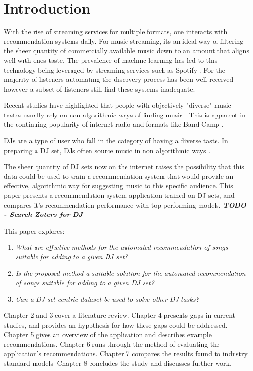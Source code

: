 
\graphicspath{{Chapter1/}}


\chapter{Introduction}
With the rise of streaming services for multiple formats, one interacts with recommendation systems daily. For music streaming, its an ideal way of filtering the sheer quantity of commercially available music down to an amount that aligns well with ones taste. The prevalence of machine learning has led to this technology being leveraged by streaming services such as Spotify \citep{httpsresearchatspotifycommachine-learning_machine_2023}. For the majority of listeners automating the discovery process has been well received however a subset of listeners still find these systems inadequate.

Recent studies have highlighted that people with objectively "diverse" music tastes usually rely on non algorithmic ways of finding music \citep{anderson_algorithmic_2020}. This is apparent in the continuing popularity of internet radio and formats like Band-Camp \citep{market_research_future_internet_2022} \citep{roberts_anti-spotify_2020}. 

DJs are a type of user who fall in the category of having a diverse taste. In preparing a DJ set, DJs often source music in non algorithmic ways \citep{allen_djs_2021}.

 The sheer quantity of DJ sets now on the internet raises the possibility that this data could be used to train a recommendation system that would provide an effective, algorithmic way for suggesting music to this specific audience. This paper presents a recommendation system application trained on DJ sets, and compares it's recommendation performance with top performing models. \textbf{\textit{TODO - Search Zotero for DJ}}

This paper explores:

\begin{enumerate}
	\item \textit{What are effective methods for the automated recommendation of songs suitable for adding to a given DJ set?}
	\item \textit{Is the proposed method a suitable solution for the automated recommendation of songs suitable for adding to a given DJ set?}
	\item \textit{Can a DJ-set centric dataset be used to solve other DJ tasks?}
\end{enumerate}

Chapter 2 and 3 cover a literature review. Chapter 4 presents gaps in current studies, and provides an hypothesis for how these gaps could be addressed. Chapter 5 gives an overview of the application and describes example recommendations. Chapter 6 runs through the method of evaluating the application's recommendations. Chapter 7 compares the results found to industry standard models. Chapter 8 concludes the study and discusses further work.
 